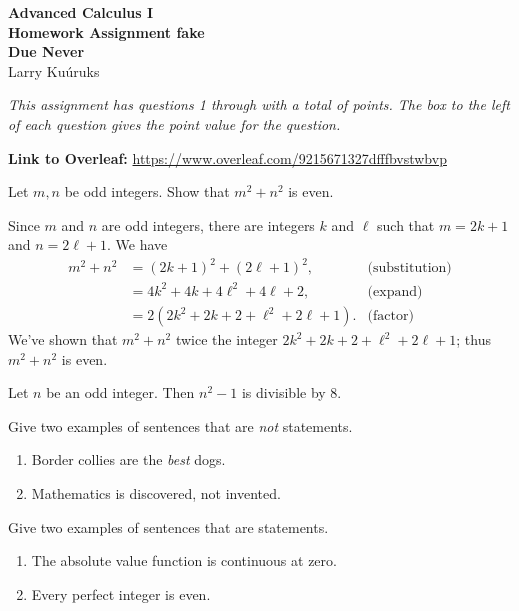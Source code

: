 \documentclass[12pt,answers]{exam}
\begin{document}
\large
\begin{flushleft}
\textbf{
Advanced Calculus I \\
Homework Assignment fake \\
Due Never  \the\year}\\
\vspace{0.25in}
Larry Kuúruks
\end{flushleft}

\noindent \emph{This assignment has questions 1 through \numquestions \/ with a total of \numpoints\/ points.  The box to the left of each question gives the point value for the question.  }


\vspace{0.25in}
\noindent \textbf{Link to Overleaf:} \url{https://www.overleaf.com/9215671327dfffbvstwbvp}

\begin{questions}

\question [2] Let $m,n$ be odd integers. Show that $m^2 + n^2$ is even.

\begin{solution}
Since $m$ and $n$ are odd integers, there are integers $k$ and $\ell$
such that $m=2 k + 1$ and $n = 2 \ell + 1$. We have
\begin{align*}
    m^2 + n^2 &= (2 k +1)^2 + (2 \ell + 1)^2, &\mbox{(substitution)} \\
              &= 4 k^2 + 4 k + 4 \ell^2 + 4 \ell + 2,  &\mbox{(expand)} \\
              &=2 (2 k^2 + 2 k + 2 + \ell^2 + 2 \ell + 1). &\mbox{(factor)}
\end{align*}
We've shown that $m^2 + n^2$ twice the integer $2 k^2 + 2 k + 2 + \ell^2 + 2\ell + 1 $; thus
$m^2 + n^2$ is even.
\end{solution}



\question[2] Let $n$ be an odd integer. Then $n^2 - 1$ is divisible by 8.

\question[2] Give two  examples of  sentences that are  \emph{not}  statements.

\begin{solution}
\begin{enumerate}
    \item Border collies are the \emph{best} dogs.
    \item Mathematics is discovered, not invented.
\end{enumerate}
\end{solution}
\question[2] Give two  examples of  sentences that are  statements.
\begin{solution}
    \begin{enumerate}
    \item The    absolute value        function is       continuous at zero.
    \item  Every perfect integer is even.
\end{enumerate}
\end{solution}



\end{questions}
\end{document}
